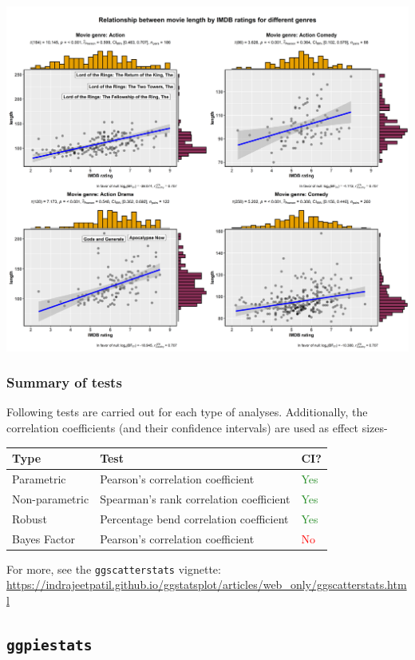 \documentclass[
]{article}
\begin{document}
\includegraphics[width=1\linewidth]{./figures/paper-ggscatterstats3-1}

\hypertarget{summary-of-tests-2}{%
\subsubsection{Summary of tests}\label{summary-of-tests-2}}

Following tests are carried out for each type of analyses. Additionally, the
correlation coefficients (and their confidence intervals) are used as effect
sizes-

\begin{longtable}[]{@{}lll@{}}
\toprule
Type & Test & CI?\tabularnewline
\midrule
\endhead
Parametric & Pearson's correlation coefficient & \textcolor{ForestGreen}{Yes}\tabularnewline
Non-parametric & Spearman's rank correlation coefficient & \textcolor{ForestGreen}{Yes}\tabularnewline
Robust & Percentage bend correlation coefficient & \textcolor{ForestGreen}{Yes}\tabularnewline
Bayes Factor & Pearson's correlation coefficient & \textcolor{red}{No}\tabularnewline
\bottomrule
\end{longtable}

For more, see the \texttt{ggscatterstats} vignette:
\url{https://indrajeetpatil.github.io/ggstatsplot/articles/web_only/ggscatterstats.html}

\hypertarget{ggpiestats}{%
\subsection{\texorpdfstring{\texttt{ggpiestats}}{ggpiestats}}\label{ggpiestats}}
\end{document}
